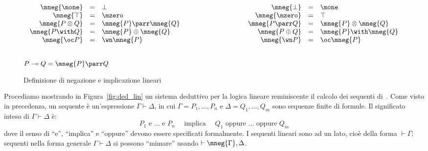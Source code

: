 \documentclass[12pt,a4paper,openright,twoside]{report}
\begin{document}
\begin{figure}
$$
\begin{array}{rclcrcl}
	\mneg{\mone} &=& \bot & \qquad\qquad\qquad\qquad & \mneg{\bot} &=& \mone \\
	\mneg{\top} &=& \mzero & & \mneg{\mzero} &=& \top \\
	\mneg{P \otimes Q} &=& \mneg{P} \parr \mneg{Q} & & \mneg{P \parr Q} &=& \mneg{P} \otimes \mneg{Q} \\
	\mneg{P \with Q} &=& \mneg{P} \oplus \mneg{Q} & & \mneg{P \oplus Q} &=& \mneg{P} \with \mneg{Q} \\
	\mneg{\oc P} &=& \wn \mneg{P} & & \mneg{\wn P} &=& \oc \mneg{P}
\end{array}
$$
~\\
\centering$P \multimap Q = \mneg{P} \parr Q$
\caption{Definizione di negazione e implicazione lineari}
\label{fig:eq_lin}
\end{figure}

Procediamo mostrando in Figura~\ref{fig:ded_lin} un sistema deduttivo per la logica lineare reminiscente il calcolo dei sequenti di~\cite{Gen35}. Come visto in precedenza, un sequente \`e un'espressione $\Gamma \vdash \Delta$, in cui $\Gamma = P_1, \dots, P_n$ e $\Delta = Q_1, \dots, Q_m$ sono sequenze finite di formule. Il significato inteso di $\Gamma \vdash \Delta$ \`e:
$$
	P_1\mbox{ e }\dots\mbox{ e }P_n \quad\mbox{ implica }\quad Q_1\mbox{ oppure }\dots\mbox{ oppure }Q_m
$$
dove il senso di ``e'', ``implica'' e ``oppure'' devono essere specificati formalmente. I sequenti lineari sono ad un lato, cio\`e della forma $\vdash \Gamma$; sequenti nella forma generale $\Gamma \vdash \Delta$ si possono ``mimare'' usando $\vdash \mneg{\Gamma}, \Delta$.
\end{document}
